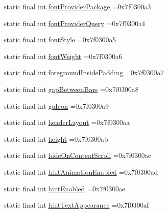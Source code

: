 \begin{DoxyCompactItemize}
static final int \mbox{\hyperlink{classbr_1_1unb_1_1cic_1_1mp_1_1marketmaster_1_1R_1_1attr_acfba6c13b99cf12c588f5f6a619cbd03}{font\+Provider\+Package}} =0x7f0300a3
\item 
static final int \mbox{\hyperlink{classbr_1_1unb_1_1cic_1_1mp_1_1marketmaster_1_1R_1_1attr_a8fc78f650c07e861e2a3f2dfe63dcf3b}{font\+Provider\+Query}} =0x7f0300a4
\item 
static final int \mbox{\hyperlink{classbr_1_1unb_1_1cic_1_1mp_1_1marketmaster_1_1R_1_1attr_a381acccf7ca0f3194b458833217a711c}{font\+Style}} =0x7f0300a5
\item 
static final int \mbox{\hyperlink{classbr_1_1unb_1_1cic_1_1mp_1_1marketmaster_1_1R_1_1attr_a16f4329bebf76b1d10f4f55e21b97872}{font\+Weight}} =0x7f0300a6
\item 
static final int \mbox{\hyperlink{classbr_1_1unb_1_1cic_1_1mp_1_1marketmaster_1_1R_1_1attr_aba24f6c8152bf52d0ce859e6ef01d415}{foreground\+Inside\+Padding}} =0x7f0300a7
\item 
static final int \mbox{\hyperlink{classbr_1_1unb_1_1cic_1_1mp_1_1marketmaster_1_1R_1_1attr_ae012062144b84ed391bd2d286de8f433}{gap\+Between\+Bars}} =0x7f0300a8
\item 
static final int \mbox{\hyperlink{classbr_1_1unb_1_1cic_1_1mp_1_1marketmaster_1_1R_1_1attr_ac99d6c2ea32af1b73e923bdbfb9ba256}{go\+Icon}} =0x7f0300a9
\item 
static final int \mbox{\hyperlink{classbr_1_1unb_1_1cic_1_1mp_1_1marketmaster_1_1R_1_1attr_a96c84d1b5a3f04c2d2242e17931a84ff}{header\+Layout}} =0x7f0300aa
\item 
static final int \mbox{\hyperlink{classbr_1_1unb_1_1cic_1_1mp_1_1marketmaster_1_1R_1_1attr_a09b8179adeda7acdaee8ae53893c7837}{height}} =0x7f0300ab
\item 
static final int \mbox{\hyperlink{classbr_1_1unb_1_1cic_1_1mp_1_1marketmaster_1_1R_1_1attr_a3b9a9880d1f40a72c2c6372f11e78a33}{hide\+On\+Content\+Scroll}} =0x7f0300ac
\item 
static final int \mbox{\hyperlink{classbr_1_1unb_1_1cic_1_1mp_1_1marketmaster_1_1R_1_1attr_a301d42c972c792b5d374f0f32c1d2e5a}{hint\+Animation\+Enabled}} =0x7f0300ad
\item 
static final int \mbox{\hyperlink{classbr_1_1unb_1_1cic_1_1mp_1_1marketmaster_1_1R_1_1attr_a99d78b2ffb9e4e5d3b924487b071a78a}{hint\+Enabled}} =0x7f0300ae
\item 
static final int \mbox{\hyperlink{classbr_1_1unb_1_1cic_1_1mp_1_1marketmaster_1_1R_1_1attr_ad7b529feeefe33f0758ae7d61238869f}{hint\+Text\+Appearance}} =0x7f0300af

\end{DoxyCompactItemize}
